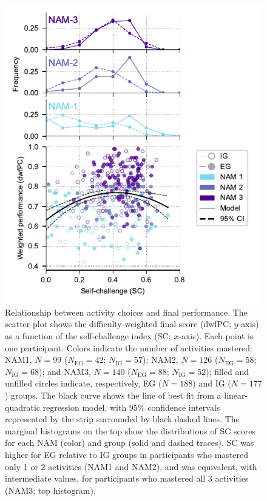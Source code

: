 \begin{figure}[tbh!]
    \centering
    \includegraphics[width=.75\columnwidth]{Figures/c4/figure4.pdf}
    \caption[short description]{Relationship between activity choices and final performance. The scatter plot shows the difficulty-weighted final score (\ac{dwfPC}; $y$-axis) as a function of the self-challenge index (SC; $x$-axis). Each point is one participant. Colors indicate the number of activities mastered: \ac{NAM}1, $N=99$ ($N_{\mathrm{EG}}=42$; $N_{\mathrm{IG}}=57$); \ac{NAM}2, $N=126$ ($N_{\mathrm{EG}}=58$; $N_{\mathrm{IG}}=68$); and \ac{NAM}3, $N=140$ ($N_{\mathrm{EG}}=88$; $N_{\mathrm{IG}}=52$); filled and unfilled circles indicate, respectively, \ac{EG} ($N=188$) and \ac{IG} ($N=177$) groups. The black curve shows the line of best fit from a linear-quadratic regression model, with $95\%$ confidence intervals represented by the strip surrounded by black dashed lines. The marginal histograms on the top show the distributions of \ac{SC} scores for each \ac{NAM} (color) and group (solid and dashed traces). \ac{SC} was higher for \ac{EG} relative to \ac{IG} groups in participants who mastered only 1 or 2 activities (\ac{NAM}1 and \ac{NAM}2), and was equivalent, with intermediate values, for participants who mastered all 3 activities (\ac{NAM}3; top histogram).}
    \label{fig:CH4_4}
\end{figure}

